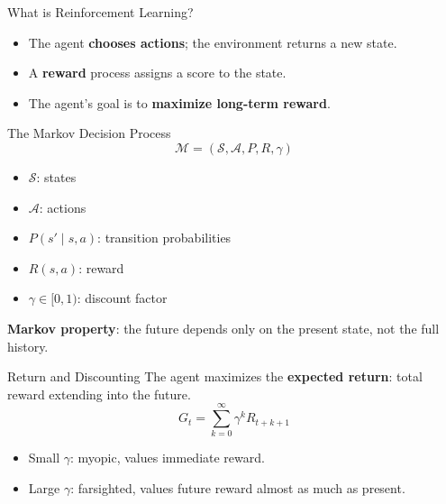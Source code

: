 \documentclass[aspectratio=169]{beamer}
\begin{document}
\begin{frame}{What is Reinforcement Learning?}
\begin{center}
\end{center}
\begin{itemize}
\item The agent \textbf{chooses actions}; the environment returns a new state.
\item A \textbf{reward} process assigns a score to the state.
\item The agent's goal is to \textbf{maximize long-term reward}.
\end{itemize}
\end{frame}

\begin{frame}{The Markov Decision Process}
\[
\mathcal{M} = (\mathcal{S}, \mathcal{A}, P, R, \gamma)
\]
\begin{itemize}
\item $\mathcal{S}$: states
\item $\mathcal{A}$: actions
\item $P(s' \mid s, a)$: transition probabilities
\item $R(s, a)$: reward
\item $\gamma \in [0,1)$: discount factor
\end{itemize}
\vspace{0.5em}
\textbf{Markov property}: the future depends only on the present state, not the full history.
\end{frame}

\begin{frame}{Return and Discounting}
The agent maximizes the \textbf{expected return}: total reward extending into the future.
\[
G_t = \sum_{k=0}^{\infty} \gamma^k R_{t+k+1}
\]
\begin{itemize}
\item Small $\gamma$: myopic, values immediate reward.
\item Large $\gamma$: farsighted, values future reward almost as much as present.
\end{itemize}
\end{frame}
\end{document}
